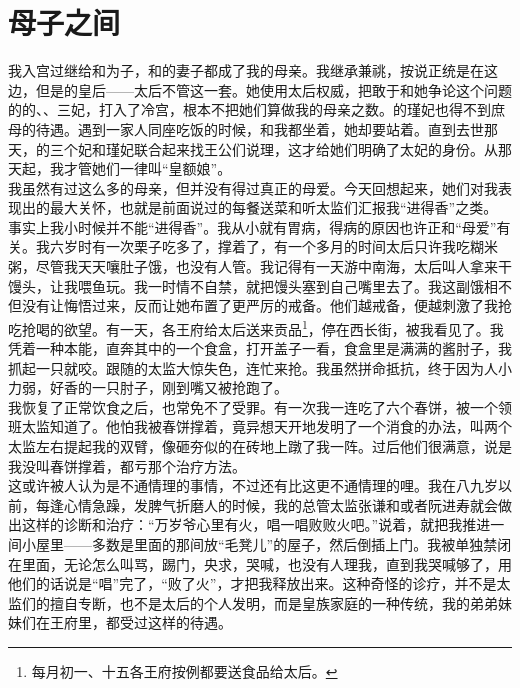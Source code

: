 \fancyhead[RO]{} %
\fancyhead[LE]{} %
\chapter*{母子之间}
\thispagestyle{empty}
我入宫过继给和为子，和的妻子都成了我的母亲。我继承兼祧，按说正统是在这边，但是的皇后——太后不管这一套。她使用太后权威，把敢于和她争论这个问题的的、、三妃，打入了冷宫，根本不把她们算做我的母亲之数。的瑾妃也得不到庶母的待遇。遇到一家人同座吃饭的时候，和我都坐着，她却要站着。直到去世那天，的三个妃和瑾妃联合起来找王公们说理，这才给她们明确了太妃的身份。从那天起，我才管她们一律叫“皇额娘”。\\

我虽然有过这么多的母亲，但并没有得过真正的母爱。今天回想起来，她们对我表现出的最大关怀，也就是前面说过的每餐送菜和听太监们汇报我“进得香”之类。\\

事实上我小时候并不能“进得香”。我从小就有胃病，得病的原因也许正和“母爱”有关。我六岁时有一次栗子吃多了，撑着了，有一个多月的时间太后只许我吃糊米粥，尽管我天天嚷肚子饿，也没有人管。我记得有一天游中南海，太后叫人拿来干馒头，让我喂鱼玩。我一时情不自禁，就把馒头塞到自己嘴里去了。我这副饿相不但没有让悔悟过来，反而让她布置了更严厉的戒备。他们越戒备，便越刺激了我抢吃抢喝的欲望。有一天，各王府给太后送来贡品\footnote{每月初一、十五各王府按例都要送食品给太后。}，停在西长街，被我看见了。我凭着一种本能，直奔其中的一个食盒，打开盖子一看，食盒里是满满的酱肘子，我抓起一只就咬。跟随的太监大惊失色，连忙来抢。我虽然拼命抵抗，终于因为人小力弱，好香的一只肘子，刚到嘴又被抢跑了。\\

我恢复了正常饮食之后，也常免不了受罪。有一次我一连吃了六个春饼，被一个领班太监知道了。他怕我被春饼撑着，竟异想天开地发明了一个消食的办法，叫两个太监左右提起我的双臂，像砸夯似的在砖地上蹾了我一阵。过后他们很满意，说是我没叫春饼撑着，都亏那个治疗方法。\\

这或许被人认为是不通情理的事情，不过还有比这更不通情理的哩。我在八九岁以前，每逢心情急躁，发脾气折磨人的时候，我的总管太监张谦和或者阮进寿就会做出这样的诊断和治疗：“万岁爷心里有火，唱一唱败败火吧。”说着，就把我推进一间小屋里——多数是里面的那间放“毛凳儿”的屋子，然后倒插上门。我被单独禁闭在里面，无论怎么叫骂，踢门，央求，哭喊，也没有人理我，直到我哭喊够了，用他们的话说是“唱”完了，“败了火”，才把我释放出来。这种奇怪的诊疗，并不是太监们的擅自专断，也不是太后的个人发明，而是皇族家庭的一种传统，我的弟弟妹妹们在王府里，都受过这样的待遇。\\

